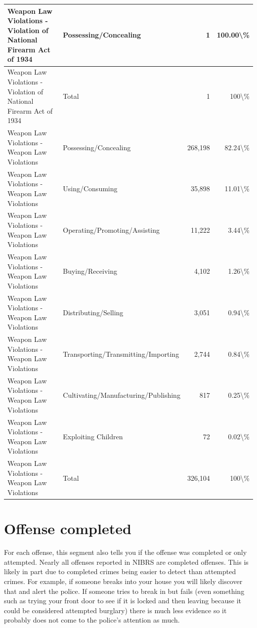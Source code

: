 \documentclass[
]{krantz}
\begin{document}
\begin{longtable}[t]{l|l|r|r}
\hline
Weapon Law Violations - Violation of National Firearm Act of 1934 & Possessing/Concealing & 1 & 100.00\textbackslash{}\%\\
\hline
Weapon Law Violations - Violation of National Firearm Act of 1934 & Total & 1 & 100\textbackslash{}\%\\
\hline
Weapon Law Violations - Weapon Law Violations & Possessing/Concealing & 268,198 & 82.24\textbackslash{}\%\\
\hline
Weapon Law Violations - Weapon Law Violations & Using/Consuming & 35,898 & 11.01\textbackslash{}\%\\
\hline
Weapon Law Violations - Weapon Law Violations & Operating/Promoting/Assisting & 11,222 & 3.44\textbackslash{}\%\\
\hline
Weapon Law Violations - Weapon Law Violations & Buying/Receiving & 4,102 & 1.26\textbackslash{}\%\\
\hline
Weapon Law Violations - Weapon Law Violations & Distributing/Selling & 3,051 & 0.94\textbackslash{}\%\\
\hline
Weapon Law Violations - Weapon Law Violations & Transporting/Transmitting/Importing & 2,744 & 0.84\textbackslash{}\%\\
\hline
Weapon Law Violations - Weapon Law Violations & Cultivating/Manufacturing/Publishing & 817 & 0.25\textbackslash{}\%\\
\hline
Weapon Law Violations - Weapon Law Violations & Exploiting Children & 72 & 0.02\textbackslash{}\%\\
\hline
Weapon Law Violations - Weapon Law Violations & Total & 326,104 & 100\textbackslash{}\%\\
\hline
\end{longtable}

\section{Offense completed}\label{offense-completed}

For each offense, this segment also tells you if the offense
was completed or only attempted. Nearly all offenses
reported in NIBRS are completed offenses. This is likely in
part due to completed crimes being easier to detect than
attempted crimes. For example, if someone breaks into your
house you will likely discover that and alert the police. If
someone tries to break in but fails (even something such as
trying your front door to see if it is locked and then
leaving because it could be considered attempted burglary)
there is much less evidence so it probably does not come to
the police's attention as much.
\end{document}
